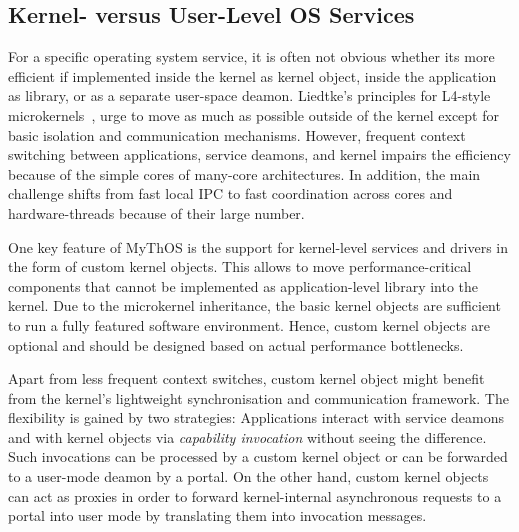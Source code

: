 \subsection{Kernel- versus User-Level OS Services}

For a specific operating system service, it is often not obvious whether its more efficient if implemented inside the kernel as kernel object, inside the application as library, or as a separate user-space deamon.
Liedtke's principles for L4-style microkernels~\cite{Liedtke1996}, urge to move as much as possible outside of the kernel except for basic isolation and communication mechanisms. 
However, frequent context switching between applications, service deamons, and kernel impairs the efficiency because of the simple cores of many-core architectures.
In addition, the main challenge shifts from fast local IPC to fast coordination across cores and hardware-threads because of their large number.


One key feature of MyThOS is the support for kernel-level services and drivers in the form of custom kernel objects. 
This allows to move performance-critical components that cannot be implemented as application-level library into the kernel. 
Due to the microkernel inheritance, the basic kernel objects are sufficient to run a fully featured software environment.
Hence, custom kernel objects are optional and should be designed based on actual performance bottlenecks.

Apart from less frequent context switches, custom kernel object might benefit from the kernel's lightweight synchronisation and communication framework. 
The flexibility is gained by two strategies: Applications interact with service deamons and with kernel objects via \emph{capability invocation} without seeing the difference. Such invocations can be processed by a custom kernel object or can be forwarded to a user-mode deamon by a portal.
On the other hand, custom kernel objects can act as proxies in order to forward kernel-internal asynchronous requests to a portal into user mode by translating them into invocation messages.


